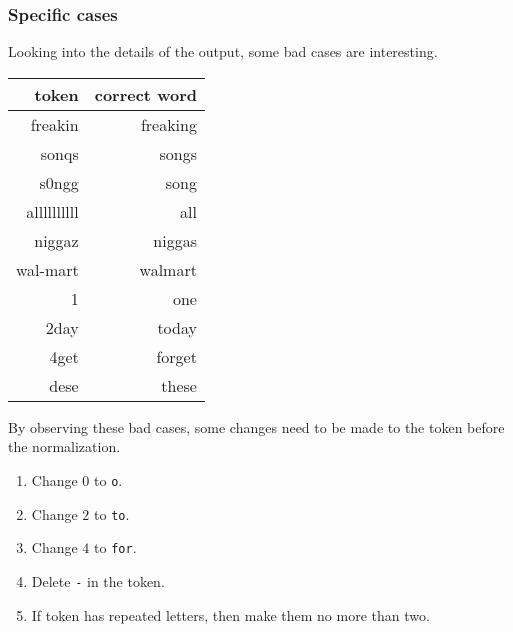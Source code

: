 \documentclass[11pt]{article}
\begin{document}
\subsubsection{Specific cases}
Looking into the details of the output, some bad cases are interesting.
\begin{center}
    \begin{tabular}{|r|r|}
      \hline
      token & correct word\\
      \hline
      freakin & freaking\\
      \hline
      sonqs & songs\\
      \hline
      s0ngg & song\\
      \hline
      allllllllll & all\\
      \hline
      niggaz & niggas\\
      \hline
      wal-mart & walmart\\
      \hline
      1 & one\\
      \hline
      2day & today\\
      \hline
      4get & forget\\
      \hline
      dese & these\\
      \hline

    \end{tabular}
\end{center}

By observing these bad cases,
some changes need to be made to the token before the normalization.
\begin{enumerate}
  \item
  Change $0$ to \texttt{o}.
  \item
  Change $2$ to \texttt{to}.
  \item
  Change $4$ to \texttt{for}.
  \item
  Delete \texttt{-} in the token.
  \item
  If token has repeated letters, then make them no more than two.
\end{enumerate}
\end{document}
